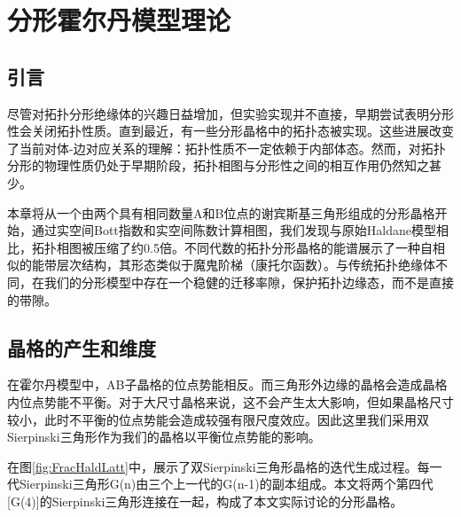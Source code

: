 \chapter{分形霍尔丹模型理论}
\section{引言}
尽管对拓扑分形绝缘体的兴趣日益增加，但实验实现并不直接，早期尝试\cite{liu2021sierpinski}表明分形性会关闭拓扑性质。直到最近，有一些分形晶格中的拓扑态被实现\cite{kempkes2019design,biesenthal2022fractal,li2023fractal,zhong2024observation,li2023fractality,LI20222040,lai2024spin,ma2023elastic,dorin2024uncovering}。这些进展改变了当前对体-边对应关系的理解：拓扑性质不一定依赖于内部体态。然而，对拓扑分形的物理性质仍处于早期阶段，拓扑相图与分形性之间的相互作用仍然知之甚少。

本章将从一个由两个具有相同数量A和B位点的谢宾斯基三角形组成的分形晶格开始，通过实空间Bott指数\cite{titum2015disorder,wang2020bosonic}和实空间陈数计算相图，我们发现与原始Haldane模型相比，拓扑相图被压缩了约0.5倍。不同代数的拓扑分形晶格的能谱展示了一种自相似的能带层次结构，其形态类似于魔鬼阶梯（康托尔函数）\cite{bak1986devil}。与传统拓扑绝缘体不同，在我们的分形模型中存在一个稳健的迁移率隙，保护拓扑边缘态，而不是直接的带隙。
\section{晶格的产生和维度}
在霍尔丹模型中，AB子晶格的位点势能相反。而三角形外边缘的晶格会造成晶格内位点势能不平衡。对于大尺寸晶格来说，这不会产生太大影响，但如果晶格尺寸较小，此时不平衡的位点势能会造成较强有限尺度效应。因此这里我们采用双Sierpinski三角形作为我们的晶格以平衡位点势能的影响。

在图\ref{fig:FracHaldLatt}中，展示了双Sierpinski三角形晶格的迭代生成过程。每一代Sierpinski三角形G(n)由三个上一代的G(n-1)的副本组成。本文将两个第四代[G(4)]的Sierpinski三角形连接在一起，构成了本文实际讨论的分形晶格。

